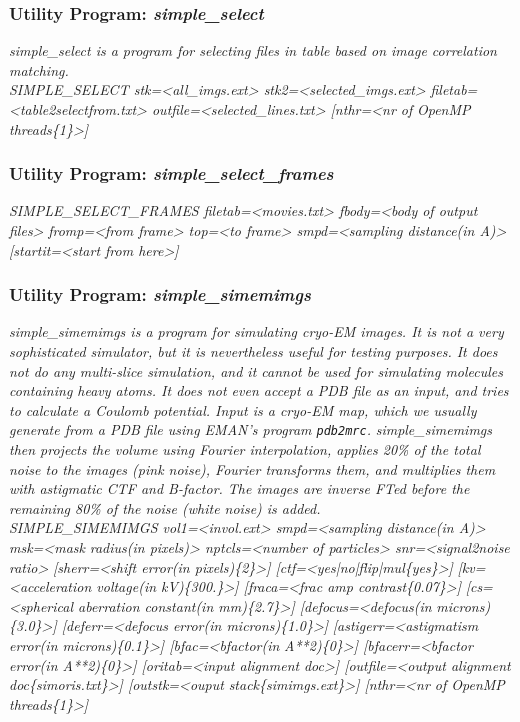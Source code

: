 \documentclass[review]{elsarticle}
\begin{document}
{{\subsubsection{Utility Program: {\it{simple\_select}}}
\label{select}
{\it{simple\_select} is a program for selecting files in table based on image correlation matching.}\\
{\it{SIMPLE\_SELECT stk=<all\_imgs.ext> stk2=<selected\_imgs.ext>}}
{\it{filetab=<table2selectfrom.txt> outfile=<selected\_lines.txt> [nthr=<nr of}}
{\it{OpenMP threads\{1\}>]}}

\subsubsection{Utility Program: {\it{simple\_select\_frames}}}
\label{select_frames}
{\it{SIMPLE\_SELECT\_FRAMES filetab=<movies.txt> fbody=<body of output files>}}
{\it{fromp=<from frame> top=<to frame> smpd=<sampling distance(in A)>}}
{\it{[startit=<start from here>]}}

\subsubsection{Utility Program: {\it{simple\_simemimgs}}}
\label{simemimgs}
{\it{simple\_simemimgs} is a program for simulating cryo-EM images. It is not a very sophisticated simulator, but it is nevertheless useful for testing purposes. It does not do any multi-slice simulation, and it cannot be used for simulating molecules containing heavy atoms. It does not even accept a PDB file as an input, and tries to calculate a Coulomb potential. Input is a cryo-EM map, which we usually generate from a PDB file using EMAN's program \texttt{pdb2mrc}.} {\it{simple\_simemimgs} then projects the volume using Fourier interpolation, applies 20\% of the total noise to the images (pink noise), Fourier transforms them, and multiplies them with astigmatic CTF and B-factor. The images are inverse FTed before the remaining 80\% of the noise (white noise) is added.}\\
{\it{SIMPLE\_SIMEMIMGS vol1=<invol.ext> smpd=<sampling distance(in A)> msk=<mask}}
{\it{radius(in pixels)> nptcls=<number of particles> snr=<signal2noise ratio>}}
{\it{[sherr=<shift error(in pixels)\{2\}>] [ctf=<yes|no|flip|mul\{yes\}>]}}
{\it{[kv=<acceleration voltage(in kV)\{300.\}>] [fraca=<frac amp contrast\{0.07\}>]}}
{\it{[cs=<spherical aberration constant(in mm)\{2.7\}>] [defocus=<defocus(in}}
{\it{microns)\{3.0\}>] [deferr=<defocus error(in microns)\{1.0\}>]}}
{\it{[astigerr=<astigmatism error(in microns)\{0.1\}>] [bfac=<bfactor(in}}
{\it{A**2)\{0\}>] [bfacerr=<bfactor error(in A**2)\{0\}>] [oritab=<input alignment}}
{\it{doc>] [outfile=<output alignment doc\{simoris.txt\}>] [outstk=<ouput}}
{\it{stack\{simimgs.ext\}>] [nthr=<nr of OpenMP threads\{1\}>]}}

}}
\end{document}
